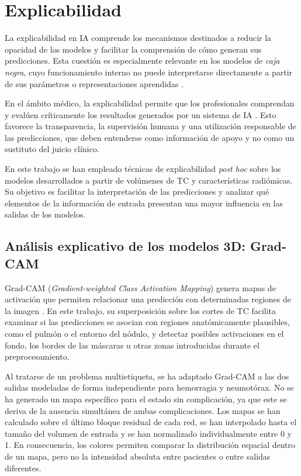 \chapter{Explicabilidad}\label{chap:explicabilidad}

La explicabilidad en IA comprende los mecanismos destinados a reducir la opacidad de los modelos y facilitar la comprensión de cómo generan sus predicciones. Esta cuestión es especialmente relevante en los modelos de \textit{caja negra}, cuyo funcionamiento interno no puede interpretarse directamente a partir de sus parámetros o representaciones aprendidas \cite{ursin2023levels}.

En el ámbito médico, la explicabilidad permite que los profesionales comprendan y evalúen críticamente los resultados generados por un sistema de IA \cite{hildt2025role}. Esto favorece la transparencia, la supervisión humana y una utilización responsable de las predicciones, que deben entenderse como información de apoyo y no como un sustituto del juicio clínico.

En este trabajo se han empleado técnicas de explicabilidad \textit{post hoc} sobre los modelos desarrollados a partir de volúmenes de TC y características radiómicas. Su objetivo es facilitar la interpretación de las predicciones y analizar qué elementos de la información de entrada presentan una mayor influencia en las salidas de los modelos.

\section{Análisis explicativo de los modelos 3D: Grad-CAM}

Grad-CAM (\textit{Gradient-weighted Class Activation Mapping}) genera mapas de activación que permiten relacionar una predicción con determinadas regiones de la imagen \cite{Selvaraju2017GradCAM}. En este trabajo, su superposición sobre los cortes de TC facilita examinar si las predicciones se asocian con regiones anatómicamente plausibles, como el pulmón o el entorno del nódulo, y detectar posibles activaciones en el fondo, los bordes de las máscaras u otras zonas introducidas durante el preprocesamiento.

Al tratarse de un problema multietiqueta, se ha adaptado Grad-CAM a las dos salidas modeladas de forma independiente para hemorragia y neumotórax. No se ha generado un mapa específico para el estado sin complicación, ya que este se deriva de la ausencia simultánea de ambas complicaciones. Los mapas se han calculado sobre el último bloque residual de cada red, se han interpolado hasta el tamaño del volumen de entrada y se han normalizado individualmente entre 0 y 1. En consecuencia, los colores permiten comparar la distribución espacial dentro de un mapa, pero no la intensidad absoluta entre pacientes o entre salidas diferentes.

